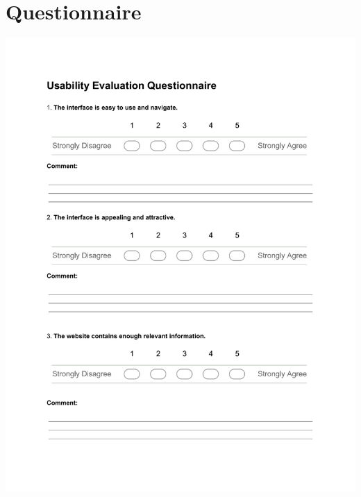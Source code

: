 \section{Questionnaire}
\vspace*{3.7em}
\begin{centering}
\includegraphics[trim = 40 160 0 60,scale=0.9]{forms/finalEvaluationPage1.pdf}
\end{centering}

